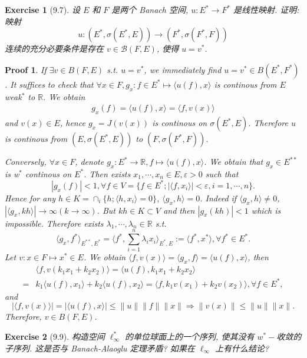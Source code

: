 \documentclass[hyperref,UTF8]{ctexart}
\newtheorem{ex}{Exercise}[section]
\newtheorem{pf}{Proof}[section]
\newcommand{\lrangle}[2]{\langle #1, #2 \rangle}
\begin{document}
\begin{ex}[9.7]
    设 $E$ 和 $F$ 是两个 Banach 空间, $u: E^{*} \rightarrow F^{*}$ 是线性映射. 证明: 映射
$$
u:\left(E^{*}, \sigma\left(E^{*}, E\right)\right) \rightarrow\left(F^{*}, \sigma\left(F^{*}, F\right)\right)
$$
连续的充分必要条件是存在 $v \in \mathcal{B}(F, E)$, 使得 $u=v^{*}$. 
\end{ex}

\begin{pf}
    If $\exists v\in B(F, E)$ s.t. $u = v^*$, we immediately find $u = v^*\in B(E^*, F^*)$. It suffices to check that $\forall x\in F, g_x: f\in E^*\mapsto \lrangle{u(f)}{x}$ is continous from $E$ weak$^*$ to $\mathbb R$. We obtain  
    \[ \begin{aligned}
        g_x(f) = \lrangle{u(f)}{x}=\lrangle{f}{v(x)}
    \end{aligned} \]
    and $v(x)\in E$, hence $g_x = J(v(x))$ is continous on $\sigma(E^*, E)$. Therefore $u$ is continous from $(E, \sigma(E^*, E))$ to $(F, \sigma(F^*, F))$. 

    Conversely, $\forall x \in F$, denote $g_x: E^*\to \mathbb R, f\mapsto \lrangle{u(f)}{x}$. We obtain that $g_x\in E^{**}$ is w$^*$ continous on $E^*$. Then exists $x_1, \cdots, x_n\in E, \varepsilon > 0$ such that 
    \[ |g_x(f)| < 1 , \forall f\in V = \{ f\in E^*; |\lrangle{f}{x_i}| < \varepsilon , i = 1,\cdots, n \}.  \]
    Hence for any $h\in K = \cap_i \{h; \lrangle{h}{x_i} = 0\}$, $\lrangle{g_x}{h}= 0$. Indeed if $\lrangle{g_x}{h} \neq 0$, $|\lrangle{g_x}{kh}|\to \infty(k\to\infty)$. But $kh\in K\subset V$ and then $|g_x(kh)|<1$ which is impossible. Therefore exists $\lambda_1, \cdots, \lambda_n\in \mathbb R$ s.t. 
    \[\lrangle{g_x}{f^*}_{E^{**}, E^*} = \lrangle{f^*}{\sum_{i=1}^n\lambda_i x_i}_{E^*, E}:= \lrangle{f^*}{x^*}, \forall f^*\in E^*. \]
    Let $v: x\in F\mapsto x^*\in E$. We obtain $\lrangle{f}{v(x)} = \lrangle{g_x}{f} = \lrangle{u(f)}{x}$, then
    \[ \begin{aligned} 
        &\lrangle{f}{v(k_1x_1 + k_2x_2)} = \lrangle{u(f)}{k_1x_1 +k_2x_2}\\
        =&k_1\lrangle{u(f)}{x_1} + k_2\lrangle{u(f)}{x_2}
        =\lrangle{f}{k_1v(x_1) + k_2v(x_2)}, \forall f\in E^*,
    \end{aligned}\]
    and
    \[ |\lrangle{f}{v(x)}| = |\lrangle{u(f)}{x}|\leq \|u\|\|f\|\|x\|\Rightarrow \|v(x)\|\leq \|u\|\|x\|. \]
    Therefore, $v\in B(F, E)$. 
\end{pf}\newpage

\begin{ex}[9.9]
    构造空间 $\ell_{\infty}^{*}$ 的单位球面上的一个序列, 使其没有 $w^{*}-$收敛的子序列. 这是否与 Banach-Alaoglu 定理矛盾? 如果在 $\ell_{\infty}$ 上有什么结论?
\end{ex}
\end{document}
